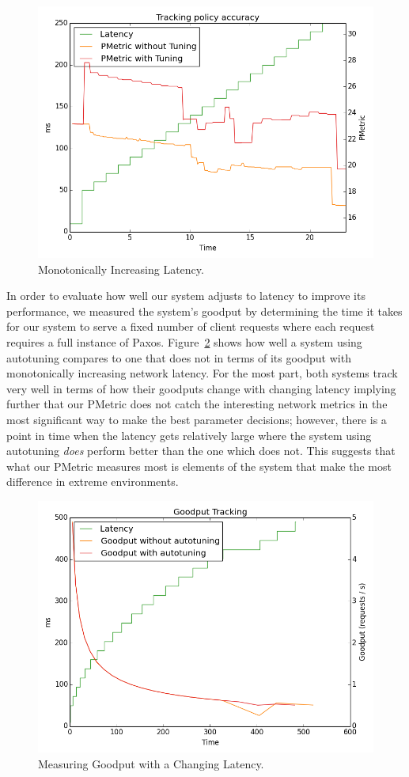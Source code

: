\begin{figure}[htbp]
\begin{center}
\includegraphics[width=\columnwidth]{monotonic_shift}
\caption{Monotonically Increasing Latency.}
\label{monotonic_shift}
\end{center}
\end{figure}

In order to evaluate how well our system adjusts to latency to improve its performance, we measured the system's goodput by determining the time it takes for our system to serve a fixed number of client requests where each request requires a full instance of Paxos.  Figure~\ref{goodput} shows how well a system using autotuning compares to one that does not in terms of its goodput with monotonically increasing network latency.  For the most part, both systems track very well in terms of how their goodputs change with changing latency implying further that our PMetric does not catch the interesting network metrics in the most significant way to make the best parameter decisions; however, there is a point in time when the latency gets relatively large where the system using autotuning \emph{does} perform better than the one which does not.  This suggests that what our PMetric measures most is elements of the system that make the most difference in extreme environments.  

\begin{figure}[htbp]
\begin{center}
\includegraphics[width=\columnwidth]{goodput}
\caption{Measuring Goodput with a Changing Latency.}
\label{goodput}
\end{center}
\end{figure}